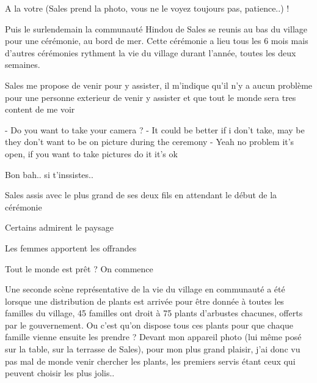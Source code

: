 \begin{multicols}{2}
A la votre (Sales prend la photo, vous ne le voyez toujours pas, patience..) !

Puis le surlendemain la communauté Hindou de Sales se reunis au bas du village pour une cérémonie, au bord de mer. Cette cérémonie a lieu tous les 6 mois mais d'autres cérémonies rythment la vie du village durant l'année, toutes les deux semaines.

Sales me propose de venir pour y assister, il m'indique qu'il n'y a aucun problème pour une personne exterieur de venir y assister et que tout le monde sera tres content de me voir

- Do you want to take your camera ?
- It could be better if i don't take, may be they don't want to be on picture during the ceremony
- Yeah no problem it's open, if you want to take pictures do it it's ok

Bon bah.. si t'inssistes..

Sales assis avec le plus grand de ses deux fils en attendant le début de la cérémonie


Certains admirent le paysage


Les femmes apportent les offrandes



Tout le monde est prêt ? On commence



Une seconde scène représentative de la vie du village en communauté a été lorsque une distribution de plants est arrivée pour être donnée à toutes les familles du village, 45 familles ont droit à 75 plants d'arbustes chacunes, offerts par le gouvernement. Ou c'est qu'on dispose tous ces plants pour que chaque famille vienne ensuite les prendre ? Devant mon appareil photo (lui même posé sur la table, sur la terrasse de Sales), pour mon plus grand plaisir, j'ai donc vu pas mal de monde venir chercher les plants, les premiers servis étant ceux qui peuvent choisir les plus jolis..


\end{multicols}
